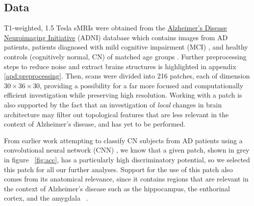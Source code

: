 \documentclass{article}
\begin{document}
\subsection{Data}

T1-weighted, 1.5 Tesla sMRIs were obtained from the \href{adni.loni.usc.edu}{Alzheimer's Disease
  Neuroimaging Initiative} (ADNI) database which contains images from AD patients, patients
diagnosed with mild cognitive impairment (MCI) \citep{gauthier2006mild}, and healthy controls
(cognitively normal, CN) of matched age groups \citep{jack2008alzheimer}. Further preprocessing
steps to reduce noise and extract brains structures is highlighted in appendix
\ref{apd:preprocessing}. Then, scans were divided into 216 patches, each of dimension
$30\times36\times30$, providing a possibility for a far more focused and computationally efficient
investigation while preserving high resolution. Working with a patch is also supported by the fact
that an investigation of \emph{local} changes in brain architecture may filter out topological
features that are less relevant in the context of Alzheimer's disease, and has yet to be performed.

From earlier work attempting to classify CN subjects from AD patients using a convolutional neural
network (CNN) \citep{bruningk2020image}, we know that a given patch, shown in grey in figure
~\ref{fig:acc}, has a particularly high discriminatory potential, so we selected this patch for all
our further analyses. Support for the use of this patch also comes from its anatomical relevance,
since it contains regions that are relevant in the context of Alzheimer's disease such as the
hippocampus, the enthorinal cortex, and the amygdala ~\citep{goedert2006century}.
\end{document}
